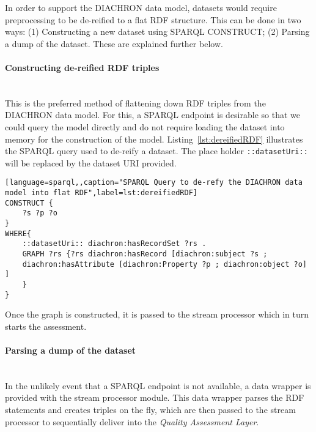 In order to support the DIACHRON data model, datasets would require preprocessing to be de-reified to a flat RDF structure.
This can be done in two ways: (1) Constructing a new dataset using SPARQL CONSTRUCT; (2) Parsing a dump of the dataset.
These are explained further below.

\paragraph{Constructing de-reified RDF triples}~\\
This is the preferred method of flattening down RDF triples from the DIACHRON data model.
For this, a SPARQL endpoint is desirable so that we could query the model directly and do not require loading the dataset into memory for the construction of the model.
Listing~\ref{lst:dereifiedRDF} illustrates the SPARQL query used to de-reify a dataset.
The place holder \texttt{::datasetUri::} will be replaced by the dataset URI provided.
\begin{lstlisting}[language=sparql,,caption="SPARQL Query to de-refy the DIACHRON data model into flat RDF",label=lst:dereifiedRDF]
CONSTRUCT {
	?s ?p ?o
}
WHERE{
	::datasetUri:: diachron:hasRecordSet ?rs .
	GRAPH ?rs {?rs diachron:hasRecord [diachron:subject ?s ;
	diachron:hasAttribute [diachron:Property ?p ; diachron:object ?o] ]
	}
}
\end{lstlisting}
Once the graph is constructed, it is passed to the stream processor which in turn starts the assessment.

\paragraph{Parsing a dump of the dataset}~\\
In the unlikely event that a SPARQL endpoint is not available, a data wrapper is provided with the stream processor module.
This data wrapper parses the RDF statements and creates triples on the fly, which are then passed to the stream processor to sequentially deliver into the \emph{Quality Assessment Layer}.

